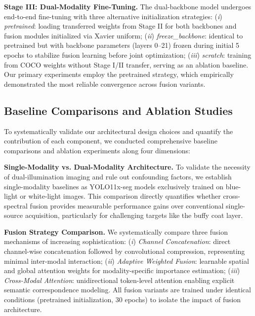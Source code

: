 \documentclass[journal,twoside,web]{ieeecolor}
\begin{document}
\textbf{Stage III: Dual-Modality Fine-Tuning.} The dual-backbone model undergoes end-to-end fine-tuning with three alternative initialization strategies: (\textit{i}) \textit{pretrained}: loading transferred weights from Stage II for both backbones and fusion modules initialized via Xavier uniform; (\textit{ii}) \textit{freeze\_backbone}: identical to pretrained but with backbone parameters (layers 0--21) frozen during initial 5 epochs to stabilize fusion learning before joint optimization; (\textit{iii}) \textit{scratch}: training from COCO weights without Stage I/II transfer, serving as an ablation baseline. Our primary experiments employ the pretrained strategy, which empirically demonstrated the most reliable convergence across fusion variants.

\subsection{Baseline Comparisons and Ablation Studies}

To systematically validate our architectural design choices and quantify the contribution of each component, we conducted comprehensive baseline comparisons and ablation experiments along four dimensions:

\textbf{Single-Modality vs. Dual-Modality Architecture.} To validate the necessity of dual-illumination imaging and rule out confounding factors, we establish single-modality baselines as YOLO11x-seg models exclusively trained on blue-light or white-light images. 
This comparison directly quantifies whether cross-spectral fusion provides measurable performance gains over conventional single-source acquisition, particularly for challenging targets like the buffy coat layer.

\textbf{Fusion Strategy Comparison.} We systematically compare three fusion mechanisms of increasing sophistication: (\textit{i}) \textit{Channel Concatenation}: direct channel-wise concatenation followed by convolutional compression, representing minimal inter-modal interaction; (\textit{ii}) \textit{Adaptive Weighted Fusion}: learnable spatial and global attention weights for modality-specific importance estimation; (\textit{iii}) \textit{Cross-Modal Attention}: unidirectional token-level attention enabling explicit semantic correspondence modeling. All fusion variants are trained under identical conditions (pretrained initialization, 30 epochs) to isolate the impact of fusion architecture.
\end{document}
